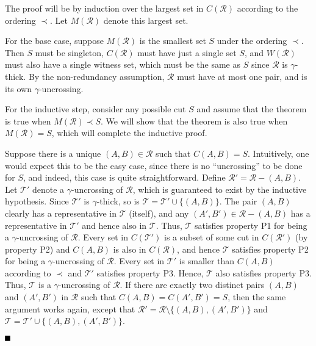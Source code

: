 \documentclass[11pt]{article}
\newcommand{\qed}{\mbox{}\hspace*{\fill}\nolinebreak\mbox{$\rule{0.6em}{0.6em}$}
}
\newenvironment{proofof}[1]{\noindent{\bf Proof of #1:}}{$\qed$\par}
\newcommand{\coll}{{\mathcal R}}
\newcommand{\colltwo}{{\mathcal T}}
\begin{document}
\begin{proofof}{Theorem~\ref{thm:uncross}}
  The proof will be by induction over the largest set in $C(\coll)$ according
  to the ordering $\prec$. Let $M(\coll)$ denote this largest set.

  For the base case, suppose $M(\coll)$ is the smallest set $S$ under the
  ordering $\prec$. Then $S$ must be singleton, $C(\coll)$ must have just a
  single set $S$, and $W(\coll)$ must also have a single witness set, which
  must be the same as $S$ since $\coll$ is $\gamma$-thick. By the
  non-redundancy assumption, $\coll$ must have at most one pair, and is its
  own $\gamma$-uncrossing.

  For the inductive step, consider any possible cut $S$ and assume that the
  theorem is true when $M(\coll) \prec S$. We will show that the theorem is
  also true when $M(\coll) = S$, which will complete the inductive proof.

  Suppose there is a unique $(A,B) \in \coll$ such that $C(A,B) =
  S$. Intuitively, one would expect this to be the easy case, since there is
  no ``uncrossing'' to be done for $S$, and indeed, this case is quite
  straightforward. Define $\coll' = \coll - (A,B)$. Let $\colltwo'$ denote a
  $\gamma$-uncrossing of $\coll$, which is guaranteed to exist by the
  inductive hypothesis. Since $\colltwo'$ is $\gamma$-thick, so is $\colltwo =
  \colltwo' \cup \{(A,B)\}$. The pair $(A,B)$ clearly has a representative in
  $\colltwo$ (itself), and any $(A',B') \in \coll - (A,B)$ has a
  representative in $\colltwo'$ and hence also in $\colltwo$. Thus, $\colltwo$
  satisfies property P1 for being a $\gamma$-uncrossing of $\coll$.  Every set
  in $C(\colltwo')$ is a subset of some cut in $C(\coll')$ (by property P2)
  and $C(A,B)$ is also in $C(\coll)$, and hence $\colltwo$ satisfies property
  P2 for being a $\gamma$-uncrossing of $\coll$. Every set in $\colltwo'$ is
  smaller than $C(A,B)$ according to $\prec$ and $\colltwo'$ satisfies
  property P3. Hence, $\colltwo$ also satisfies property P3. Thus, $\colltwo$
  is a $\gamma$-uncrossing of $\coll$. If there are exactly two distinct pairs
  $(A,B)$ and $(A',B')$ in $\coll$ such that $C(A,B) = C(A',B') = S$, then the
  same argument works again, except that $\coll' = \coll \setminus\{ (A,B)
  ,(A',B')\}$ and $\colltwo = \colltwo' \cup \{(A,B),(A',B')\}$.


\end{proofof}
\end{document}
